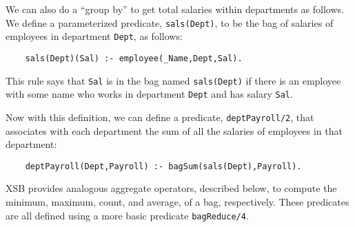 We can also do a ``group by'' to get total salaries within departments
as follows.  We define a parameterized predicate, \verb|sals(Dept)|,
to be the bag of salaries of employees in department \verb|Dept|, as
follows:
\begin{verbatim}
    sals(Dept)(Sal) :- employee(_Name,Dept,Sal).
\end{verbatim}
This rule says that \verb|Sal| is in the bag named \verb|sals(Dept)|
if there is an employee with some name who works in department
\verb|Dept| and has salary \verb|Sal|.

Now with this definition, we can define a predicate,
\verb|deptPayroll/2|, that associates with each department the sum of
all the salaries of employees in that department:
\begin{verbatim}
    deptPayroll(Dept,Payroll) :- bagSum(sals(Dept),Payroll).
\end{verbatim}

XSB provides analogous aggregate operators, described below, to
compute the minimum, maximum, count, and average, of a bag,
respectively.  These predicates are all defined using a more basic
predicate \verb|bagReduce/4|.

